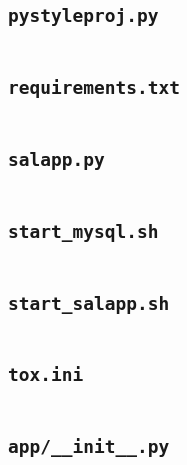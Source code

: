\subsection{\texttt{pystyleproj.py}}
\begin{codelisting}
\inputminted[breakanywhere]{python3}{../uswacs-2-iy2d502-salapp/pystyleproj.py}\end{codelisting}
\subsection{\texttt{requirements.txt}}
\begin{codelisting}
\label{fcl:salapp:requirements}
\inputminted[breakanywhere]{text}{../uswacs-2-iy2d502-salapp/requirements.txt}\end{codelisting}
\subsection{\texttt{salapp.py}}
\begin{codelisting}
\inputminted[breakanywhere]{python3}{../uswacs-2-iy2d502-salapp/salapp.py}\end{codelisting}
\subsection{\texttt{start\_mysql.sh}}
\begin{codelisting}
\inputminted[breakanywhere]{bash}{../uswacs-2-iy2d502-salapp/start_mysql.sh}\end{codelisting}
\subsection{\texttt{start\_salapp.sh}}
\begin{codelisting}
\inputminted[breakanywhere]{bash}{../uswacs-2-iy2d502-salapp/start_salapp.sh}\end{codelisting}
\subsection{\texttt{tox.ini}}
\begin{codelisting}
\inputminted[breakanywhere]{text}{../uswacs-2-iy2d502-salapp/tox.ini}\end{codelisting}
\subsection{\texttt{app/\_\_init\_\_.py}}
\begin{codelisting}
\inputminted[breakanywhere]{python3}{../uswacs-2-iy2d502-salapp/app/__init__.py}\end{codelisting}
